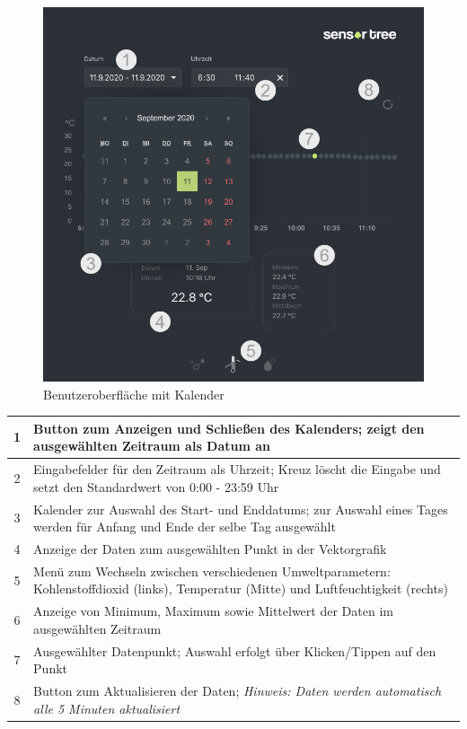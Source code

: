 \documentclass{article}
\begin{document}
\begin{figure}[H]
    \includegraphics[width=\textwidth]{ui-with-dots}
    \centering
    \caption{Benutzeroberfläche mit Kalender}
    \label{fig:Benutzeroberfläche mit Kalender}
\end{figure}

\begin{table}[H]
\begin{tabular}{|c|p{}|}
    \hline
    1 & Button zum Anzeigen und Schließen des Kalenders; zeigt den ausgewählten Zeitraum als Datum an \\ \hline
    2 & Eingabefelder für den Zeitraum als Uhrzeit; Kreuz löscht die Eingabe und setzt den Standardwert von 0:00 - 23:59 Uhr\\ \hline
    3 & Kalender zur Auswahl des Start- und Enddatums; zur Auswahl eines Tages werden für Anfang und Ende der selbe Tag ausgewählt\\ \hline
    4 & Anzeige der Daten zum ausgewählten Punkt in der Vektorgrafik \\ \hline
    5 & Menü zum Wechseln zwischen verschiedenen Umweltparametern: Kohlenstoffdioxid (links), Temperatur (Mitte) und Luftfeuchtigkeit (rechts)\\ \hline
    6 & Anzeige von Minimum, Maximum sowie Mittelwert der Daten im ausgewählten Zeitraum \\ \hline
    7 & Ausgewählter Datenpunkt; Auswahl erfolgt über Klicken/Tippen auf den Punkt\\ \hline
    8 & Button zum Aktualisieren der Daten; \textit{Hinweis: Daten werden automatisch alle 5 Minuten aktualisiert} \\ \hline
\end{tabular}
\end{table}
\end{document}
